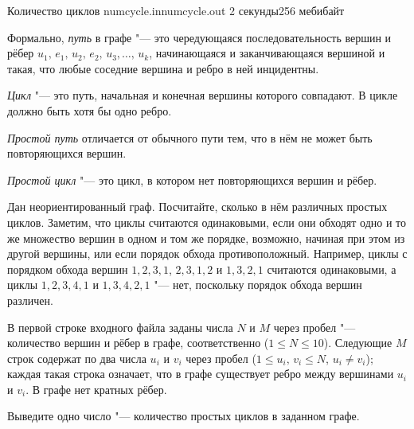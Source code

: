\begin{problem}{Количество циклов}
{numcycle.in}{numcycle.out}
{2 секунды}{256 мебибайт}{}

 Формально, {\it путь} в графе "--- это чередующаяся последовательность
 вершин и рёбер $u_1, \, e_1, \, u_2, \, e_2, \, u_3, \ldots, \, u_k$,
 начинающаяся и заканчивающаяся вершиной и такая, что любые соседние вершина
 и ребро в ней инцидентны.

 {\it Цикл} "--- это путь, начальная и конечная вершины которого совпадают.
 В цикле должно быть хотя бы одно ребро.

 {\it Простой путь} отличается от обычного пути тем, что в нём не может
 быть повторяющихся вершин.
 
 {\it Простой цикл} "--- это цикл, в котором нет повторяющихся вершин и
 рёбер.

 Дан неориентированный граф. Посчитайте, сколько в нём различных простых
 циклов. Заметим, что циклы считаются одинаковыми, если они обходят одно
 и то же множество вершин в одном и том же порядке, возможно, начиная при
 этом из другой вершины, или если порядок обхода противоположный. Например,
 циклы с порядком обхода вершин $1, 2, 3, 1$, $2, 3, 1, 2$ и $1, 3, 2, 1$
 считаются одинаковыми, а циклы $1, 2, 3, 4, 1$ и $1, 3, 4, 2, 1$ "--- нет,
 поскольку порядок обхода вершин различен.

\InputFile

 В первой строке входного файла заданы числа $N$ и $M$ через пробел "---
 количество вершин и рёбер в графе, соответственно
 ($1 \leqslant N \leqslant 10$).
 Следующие $M$ строк содержат по два числа $u_i$ и $v_i$ через пробел
 ($1 \leqslant u_i, \, v_i \leqslant N$, $u_i \neq v_i$);
 каждая такая строка означает, что в графе существует ребро между вершинами
 $u_i$ и $v_i$. В графе нет кратных рёбер.

\OutputFile

 Выведите одно число "--- количество простых циклов в заданном графе.

\Examples

\begin{example}
%
%
\end{example}

\end{problem}

